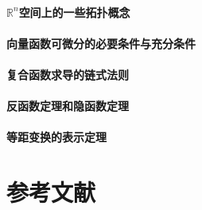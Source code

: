 \documentclass[zihao=-4,linespread=1.5,heading=true,a4paper,twoside]{ctexart}
\begin{document}
\subsection{$\mathbb{R}^n$空间上的一些拓扑概念}


\subsection{向量函数可微分的必要条件与充分条件}


\subsection{复合函数求导的链式法则}


\subsection{反函数定理和隐函数定理}


\subsection{等距变换的表示定理}


%



\newpage\part*{参考文献}
\printbibliography[heading=none]
\end{document}
